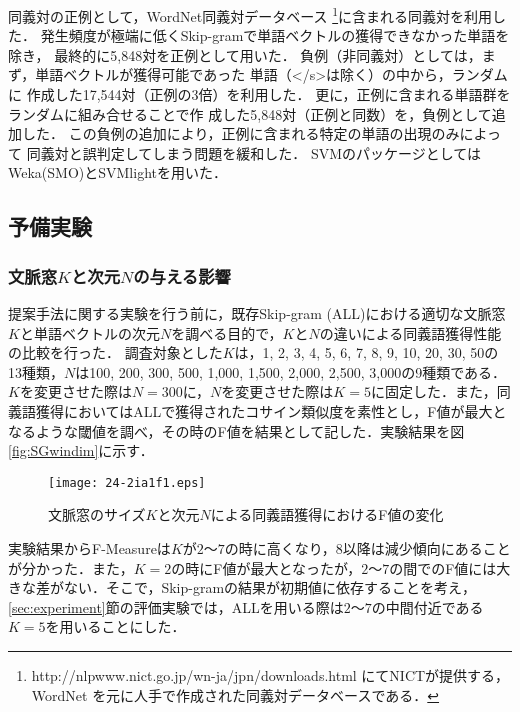 \documentclass[japanese]{jnlp_1.4}
\begin{document}
同義対の正例として，WordNet同義対データベース
\footnote{http://nlpwww.nict.go.jp/wn-ja/jpn/downloads.html にてNICTが提供する，WordNet \cite{wordnet}を元に人手で作成された同義対データベースである．}に含まれる同義対を利用した．
発生頻度が極端に低くSkip-gramで単語ベクトルの獲得できなかった単語を除き，
最終的に5,848対を正例として用いた．
負例（非同義対）としては，まず，単語ベクトルが獲得可能であった
単語（\textless/s\textgreater は除く）の中から，ランダムに
作成した17,544対（正例の3倍）を利用した．
更に，正例に含まれる単語群をランダムに組み合せることで作
成した5,848対（正例と同数）を，負例として追加した．
この負例の追加により，正例に含まれる特定の単語の出現のみによって
同義対と誤判定してしまう問題を緩和した．
SVMのパッケージとしてはWeka(SMO)とSVMlightを用いた．


\subsection{予備実験}
\label{preliminary-experiment}

\subsubsection{文脈窓$K$と次元$N$の与える影響}
\label{sec:pre-kn}

提案手法に関する実験を行う前に，既存Skip-gram (ALL)における適切な文脈窓$K$と単語ベクトルの次元$N$を調べる目的で，$K$と$N$の違いによる同義語獲得性能の比較を行った．
調査対象とした$K$は，1, 2, 3, 4, 5, 6, 7, 8, 9, 10, 20, 30, 50の13種類，$N$は100, 200, 300, 500, 1,000, 1,500, 2,000, 2,500, 3,000の9種類である．$K$を変更させた際は$N=300$に，$N$を変更させた際は$K=5$に固定した．また，同義語獲得においてはALLで獲得されたコサイン類似度を素性とし，F値が最大となるような閾値を調べ，その時のF値を結果として記した．実験結果を図\ref{fig:SGwindim}に示す．

\begin{figure}[b]
\begin{center}
\texttt{[image: 24-2ia1f1.eps]}
\end{center}
\caption{文脈窓のサイズ$K$と次元$N$による同義語獲得におけるF値の変化}
\label{fig:SGwindim}
\label{fig:img}
\end{figure}

実験結果からF-Measureは$K$が$2〜7$の時に高くなり，8以降は減少傾向にあることが分かった．また，$K=2$の時にF値が最大となったが，$2〜7$の間でのF値には大きな差がない．そこで，Skip-gramの結果が初期値に依存することを考え，\ref{sec:experiment}節の評価実験では，ALLを用いる際は$2〜7$の中間付近である$K=5$を用いることにした．
\end{document}
